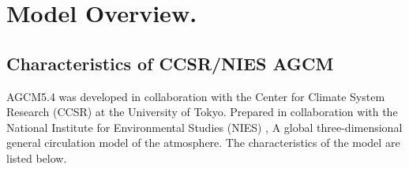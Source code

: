 \hypertarget{model-overview.}{%
\section{Model Overview.}\label{model-overview.}}

\hypertarget{characteristics-of-ccsrnies-agcm}{%
\subsection{Characteristics of CCSR/NIES
AGCM}\label{characteristics-of-ccsrnies-agcm}}

AGCM5.4 was developed in collaboration with the Center for Climate
System Research (CCSR) at the University of Tokyo. Prepared in
collaboration with the National Institute for Environmental Studies
(NIES) , A global three-dimensional general circulation model of the
atmosphere. The characteristics of the model are listed below.

